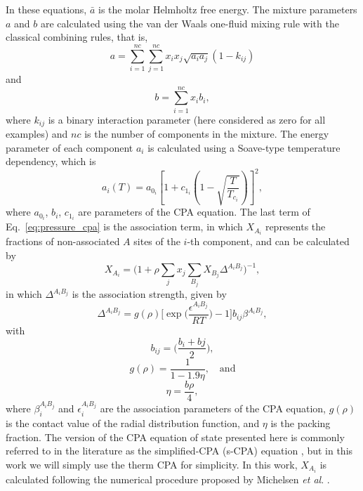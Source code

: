 \documentclass[preprint,12pt,3p]{elsarticle}
\begin{document}
	In these equations, $\bar{a}$ is the molar Helmholtz free energy. The mixture parameters $a$ and $b$ are calculated using the van der Waals one-fluid mixing rule with the classical combining rules, that is,
\begin{equation}
    a = \sum_{i=1}^{nc} \sum_{j=1}^{nc} x_{i}x_{j}\sqrt{a_{i}a_{j}}(1-k_{ij})
\end{equation}
and
\begin{equation}
    b = \sum_{i=1}^{nc}x_{i}b_{i},
\end{equation}
	where $k_{ij}$ is a binary interaction parameter (here considered as zero for all examples) and $nc$ is the number of components in the mixture. The energy parameter of each component $a_{i}$ is calculated using a Soave-type temperature dependency, which is 
\begin{equation}
a_{i}(T) = a_{0_{i}}\left[1+c_{1_{i}}\left(1-\sqrt{\frac{T}{T_{c_{i}}}}\right)\right]^2,
\end{equation}
	where $a_{0_{i}}$, $b_{i}$, $c_{1_{i}}$ are parameters of the CPA equation. The last term of Eq.~\ref{eq:pressure_cpa}  is the association term, in which $X_{A_{i}}$ represents the fractions of non-associated $A$ sites of the $i$-th component, and can be calculated by
\begin{equation} \label{eq:frac_nb}
    X_{A_{i}} = \Big(1+\rho \sum_{j}x_{j} \sum_{B_{j}} X_{B_{j}} \Delta^{A_{i}B_{j}}\Big)^{-1},
\end{equation}
    in which $\Delta^{A_{i}B_{j}}$ is the association strength, given by 
\begin{equation} \label{eq:delta_cpa}
    \Delta^{A_{i}B_{j}} = g(\rho)\Big[\exp\bigg(\frac{\epsilon^{A_{i}B_{j}}}{RT}\bigg)-1\Big]b_{ij}\beta^{A_{i}B_{j}},
\end{equation}
with
\begin{equation} \label{eq:bij}
    b_{ij} = \Big(\frac{b_{i}+b{j}}{2}\Big),
\end{equation}
\begin{equation} \label{eq:g_cpa}
    g(\rho) = \frac{1}{1-1.9\eta}, \quad \text{and}
\end{equation}
\begin{equation} \label{eq:eta_cpa}
    \eta = \frac{b\rho}{4},
\end{equation}
	where $\beta_{i}^{A_{i}B_{j}}$ and $\epsilon_{i}^{A_{i}B_{j}}$ are the association parameters of the CPA equation, $g(\rho)$ is the contact value of the radial distribution function, and $\eta$ is the packing fraction. The version of the CPA equation of state presented here is commonly referred to in the literature as the simplified-CPA (s-CPA) equation \cite{kontogeorgis1999multicomponent}, but in this work we will simply use the therm CPA for simplicity. In this work, $X_{A_{i}}$ is calculated following the numerical procedure proposed by Michelsen \textit{et al}. \cite{michelsen2006robust}.
\end{document}
